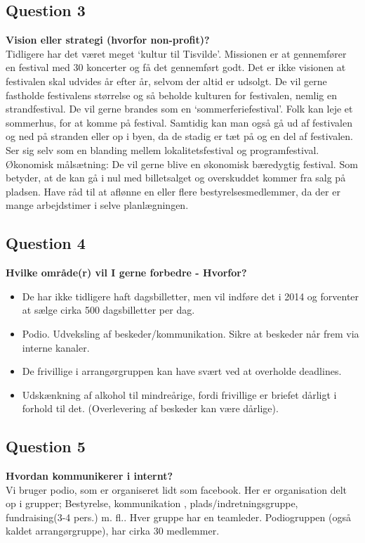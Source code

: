 \subsection{Question 3}
\label{i1q3}
\noindent \textbf{Vision eller strategi (hvorfor non-profit)?} \\
Tidligere har det været meget ‘kultur til Tisvilde’. Missionen er at gennemfører en festival med 30 koncerter og få det gennemført godt. Det er ikke visionen at festivalen skal udvides år efter år, selvom der altid er udsolgt. De vil gerne fastholde festivalens størrelse og så beholde kulturen for festivalen, nemlig en strandfestival. De vil gerne brandes som en ‘sommerferiefestival’. Folk kan leje et sommerhus, for at komme på festival. Samtidig kan man også gå ud af festivalen og ned på stranden eller op i byen, da de stadig er tæt på og en del af festivalen. Ser sig selv som en blanding mellem lokalitetsfestival og programfestival.
Økonomisk målsætning: De vil gerne blive en økonomisk bæredygtig festival. Som betyder, at de kan gå i nul med billetsalget og overskuddet kommer fra salg på pladsen. Have råd til at aflønne en eller flere bestyrelsesmedlemmer, da der er mange arbejdstimer i selve planlægningen.

\subsection{Question 4}
\label{i1q4}
\noindent \textbf{Hvilke område(r) vil I gerne forbedre - Hvorfor?} \\
\begin{itemize}
	\item De har ikke tidligere haft dagsbilletter, men vil indføre det i 2014 og forventer at sælge cirka 500 dagsbilletter per dag. 
	\item Podio. Udveksling af beskeder/kommunikation. Sikre at beskeder når frem via interne kanaler. 
	\item De frivillige i arrangørgruppen kan have svært ved at overholde deadlines. 
	\item Udskænkning af alkohol til mindreårige, fordi frivillige er briefet dårligt i forhold til det. (Overlevering af beskeder kan være dårlige).
\end{itemize}

\subsection{Question 5}
\label{i1q5}
\noindent \textbf{Hvordan kommunikerer i internt?} \\
Vi bruger podio, som er organiseret lidt som facebook. Her er organisation delt op i grupper; Bestyrelse, kommunikation , plads/indretningsgruppe, fundraising(3-4 pers.) m. fl.. Hver gruppe har en teamleder. Podiogruppen (også kaldet arrangørgruppe), har cirka 30 medlemmer. 

